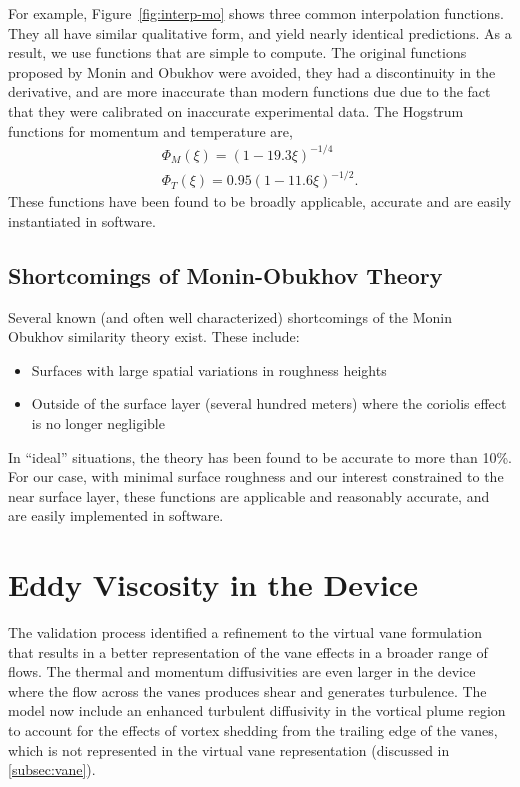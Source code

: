 For example, Figure~\ref{fig:interp-mo} shows three common interpolation  
functions. They all have similar qualitative form,  
and yield nearly identical predictions. As a result, we use functions
that are simple to compute. The original functions 
proposed by Monin and Obukhov were avoided, they had a discontinuity in
the derivative, and are more inaccurate than modern functions due due to
the fact that they were calibrated on inaccurate experimental data. The
Hogstrum functions\cite{?} for momentum and temperature are, 
\begin{eqnarray}
  \Phi_M(\xi) = (1-19.3 \xi)^{-1/4} \\
  \Phi_T(\xi) = 0.95 (1-11.6 \xi)^{-1/2}.
\end{eqnarray}
These functions have been found to be broadly applicable, accurate and 
are easily instantiated in software. 

\subsection{Shortcomings of Monin-Obukhov Theory}

Several known (and often well characterized) shortcomings of the Monin
Obukhov similarity theory exist. These include:
 
\begin{itemize}
 \item Surfaces with large spatial variations in roughness heights
 \item Outside of the surface layer (several hundred meters) where the 
       coriolis effect is no longer negligible
\end{itemize}

In ``ideal'' situations, the theory has been found to be
accurate to more than 10\%\cite{QJ:QJ49709741204,kaimal}. 
For our case, with minimal surface roughness and our interest
constrained to the near surface layer, these functions are applicable
and reasonably accurate\cite{Foken2006}, and are easily implemented in
software.  

\section{Eddy Viscosity in the Device}

The validation process identified a refinement to the virtual vane
formulation that results in a better representation of the vane
effects in a broader range of flows. The thermal and momentum
diffusivities are even larger in the device where the flow across the
vanes produces shear and generates turbulence. The model now include an
enhanced turbulent diffusivity in the vortical plume region to account
for the effects of vortex shedding from the trailing edge of the vanes,
which is not represented in the virtual vane representation (discussed in
\ref{subsec:vane}). 


